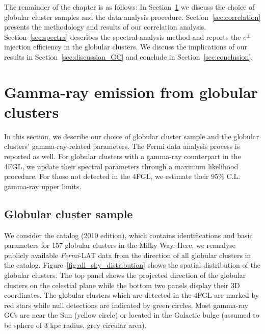\documentclass[doublespace,nopageskip]{VTthesis}
\begin{document}
The remainder of the chapter is as follows: In Section~\ref{sec:gamma_GCs} we discuss the choice of globular cluster samples and the data analysis procedure. Section~\ref{sec:correlation} presents the methodology and results of our correlation analysis. Section~\ref{sec:spectra} describes the spectral analysis method and reports the $e^\pm$ injection efficiency in the globular clusters. We discuss the implications of our results in Section~\ref{sec:discussion_GC} and conclude in Section~\ref{sec:conclusion}.

\section{Gamma-ray emission from globular clusters}\label{sec:gamma_GCs}

In this section, we describe our choice of globular cluster sample and the globular clusters' gamma-ray-related parameters. The Fermi data analysis process is reported as well. For globular clusters with a gamma-ray counterpart in the 4FGL, we update their spectral parameters through a maximum likelihood procedure. For those not detected in the 4FGL, we estimate their 95\% C.L. gamma-ray upper limits.

\subsection{Globular cluster sample}\label{sec:samples}

We consider the \citet{1996AJ....112.1487H} catalog (2010 edition), which contains identifications and basic parameters for 157 globular clusters in the Milky Way. Here, we reanalyse publicly available {\it Fermi}-LAT data from the direction of all globular clusters in the \citet{1996AJ....112.1487H} catalog. Figure~\ref{fig:all_sky_distribution} shows the spatial distribution of the globular clusters. The top panel shows the projected direction of the globular clusters on the celestial plane while the bottom two panels display their 3D coordinates. The globular clusters which are detected in the 4FGL are marked by red stars while null detections are indicated by green circles. Most gamma-ray GCs are near the Sun (yellow circle) or located in the Galactic bulge (assumed to be sphere of 3 kpc radius, grey circular area).
\end{document}
